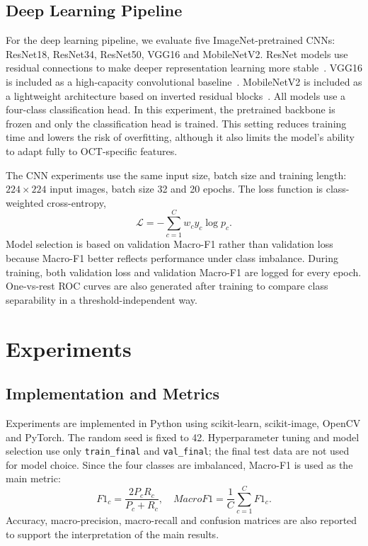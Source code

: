 \documentclass[10pt,twocolumn,letterpaper]{article}
\begin{document}
\subsection{Deep Learning Pipeline}
For the deep learning pipeline, we evaluate five ImageNet-pretrained CNNs: ResNet18, ResNet34, ResNet50, VGG16 and MobileNetV2. ResNet models use residual connections to make deeper representation learning more stable~\cite{he2016}. VGG16 is included as a high-capacity convolutional baseline~\cite{simonyan2015}. MobileNetV2 is included as a lightweight architecture based on inverted residual blocks~\cite{sandler2018}. All models use a four-class classification head. In this experiment, the pretrained backbone is frozen and only the classification head is trained. This setting reduces training time and lowers the risk of overfitting, although it also limits the model's ability to adapt fully to OCT-specific features.

The CNN experiments use the same input size, batch size and training length: $224 \times 224$ input images, batch size 32 and 20 epochs. The loss function is class-weighted cross-entropy,
\begin{equation}
    \mathcal{L}=-\sum_{c=1}^{C}w_c y_c\log p_c.
\end{equation}
Model selection is based on validation Macro-F1 rather than validation loss because Macro-F1 better reflects performance under class imbalance. During training, both validation loss and validation Macro-F1 are logged for every epoch. One-vs-rest ROC curves are also generated after training to compare class separability in a threshold-independent way.

\section{Experiments}
\subsection{Implementation and Metrics}
Experiments are implemented in Python using scikit-learn, scikit-image, OpenCV and PyTorch. The random seed is fixed to 42. Hyperparameter tuning and model selection use only \texttt{train\_final} and \texttt{val\_final}; the final test data are not used for model choice. Since the four classes are imbalanced, Macro-F1 is used as the main metric:
\begin{equation}
    F1_c=\frac{2P_cR_c}{P_c+R_c},\quad
    MacroF1=\frac{1}{C}\sum_{c=1}^{C}F1_c.
\end{equation}
Accuracy, macro-precision, macro-recall and confusion matrices are also reported to support the interpretation of the main results.
\end{document}
